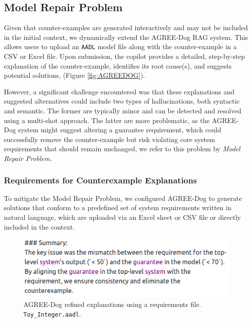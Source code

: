 \subsection{Model Repair Problem}

Given that counter-examples are generated interactively and may not be included in the initial context, we dynamically extend the AGREE-Dog RAG system. This allows users to upload an \texttt{AADL} model file along with the counter-example in a CSV or Excel file. %
Upon submission, the copilot provides a detailed, step-by-step explanation of the counter-example, identifies its root cause(s), and suggests potential solutions, (Figure \ref{fig:AGREEDOG}). 


However, a significant challenge encountered was that these explanations and suggested alternatives could include two types of hallucinations, both syntactic and semantic. The former are typically minor and can be detected and resolved using a multi-shot approach. The latter are more problematic, as the AGREE-Dog system might suggest altering a guarantee requirement, which could successfully remove the counter-example but risk violating core system requirements that should remain unchanged, we refer to this problem by \textit{Model Repair Problem}. 


\subsubsection{Requirements for Counterexample Explanations}

To mitigate the Model Repair Problem, we configured AGREE-Dog to generate solutions that conform to a predefined set of system requirements written in natural language, which are uploaded via an Excel sheet or CSV file or directly included in the context. 

\begin{figure}[t]  
    \centering
    \includegraphics[width=0.95\columnwidth]{REQ-AWARE-REF-high-res.png}  
    \caption{AGREE-Dog refined explanations using a requirements file. \texttt{Toy\_Integer.aadl}.}
    \label{fig:REQ-AWARE-EXPL}
\end{figure}


